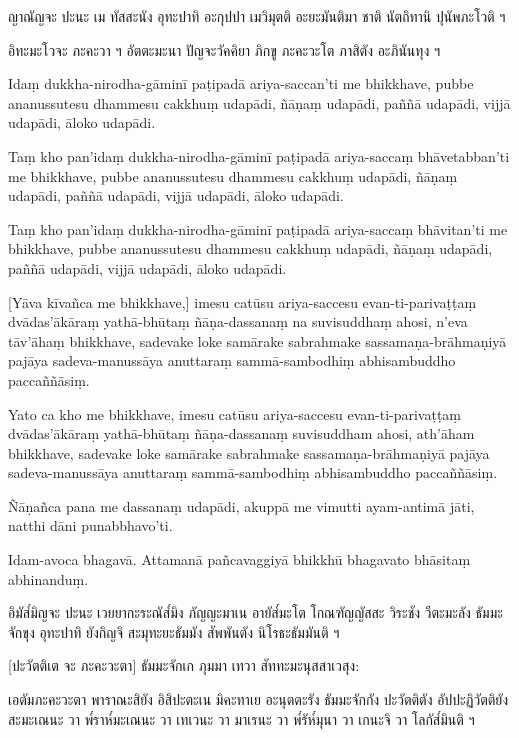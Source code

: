 \documentclass[
  babelLanguage=thai,
  final,
]{chantingbook}
\begin{document}
ญาณัญจะ ปะนะ เม ทัสสะนัง อุทะปาทิ อะกุปปา เมวิมุตติ อะยะมันติมา ชาติ นัตถิทานิ ปุนัพภะโวติ ฯ

อิทะมะโวจะ ภะคะวา ฯ อัตตะมะนา ปัญจะวัคคิยา ภิกขู ภะคะวะโต ภาสิตัง อะภินันทุง ฯ

\clearpage

\paliText
\markboth{\paliTitle}{\rightmark}

Idaṃ dukkha-nirodha-gāminī paṭipadā ariya-saccan'ti me bhikkhave, pubbe
ananussutesu dhammesu cakkhuṃ udapādi, ñāṇaṃ udapādi, paññā udapādi,
vijjā udapādi, āloko udapādi.

Taṃ kho pan'idaṃ dukkha-nirodha-gāminī paṭipadā ariya-saccaṃ bhāvetabban'ti
me bhikkhave, pubbe ananussutesu dhammesu cakkhuṃ udapādi, ñāṇaṃ
udapādi, paññā udapādi, vijjā udapādi, āloko udapādi.

Taṃ kho pan'idaṃ dukkha-nirodha-gāminī paṭipadā ariya-saccaṃ bhāvitan'ti me
bhikkhave, pubbe ananussutesu dhammesu cakkhuṃ udapādi, ñāṇaṃ udapādi,
paññā udapādi, vijjā udapādi, āloko udapādi.

[Yāva kīvañca me bhikkhave,] imesu catūsu ariya-saccesu evan-ti-parivaṭṭaṃ
dvādas'ākāraṃ yathā-bhūtaṃ ñāṇa-dassanaṃ na suvisuddhaṃ ahosi, n'eva tāv'āhaṃ
bhikkhave, sadevake loke samārake sabrahmake sassamaṇa-brāhmaṇiyā pajāya
sadeva-manussāya anuttaraṃ sammā-sambodhiṃ abhisambuddho paccaññāsiṃ.

Yato ca kho me bhikkhave, imesu catūsu ariya-saccesu evan-ti-parivaṭṭaṃ
dvādas'ākāraṃ yathā-bhūtaṃ ñāṇa-dassanaṃ suvisuddham ahosi, ath'āham
bhikkhave, sadevake loke samārake sabrahmake sassamaṇa-brāhmaṇiyā pajāya
sadeva-manussāya anuttaraṃ sammā-sambodhiṃ abhisambuddho paccaññāsiṃ.

Ñāṇañca pana me dassanaṃ udapādi, akuppā me vimutti ayam-antimā jāti,
natthi dāni punabbhavo'ti.

Idam-avoca bhagavā. Attamanā pañcavaggiyā bhikkhū bhagavato bhāsitaṃ
abhinanduṃ.

\clearpage

\thaiText
\markboth{\thaiTitle}{\rightmark}

อิมัส๎มิญจะ ปะนะ เวยยากะระณัส๎มิง ภัญญะมาเน อายัส๎มะโต โกณฑัญญัสสะ วิระชัง
วีตะมะลัง ธัมมะจักขุง อุทะปาทิ ยังกิญจิ สะมุทะยะธัมมัง สัพพันตัง นิโรธะธัมมันติ ฯ

[ปะวัตติเต จะ ภะคะวะตา] ธัมมะจักเก ภุมมา เทวา สัททะมะนุสสาเวสุง:

เอตัมภะคะวะตา พาราณะสิยัง อิสิปะตะเน มิคะทาเย อะนุตตะรัง ธัมมะจักกัง ปะวัตติตัง อัปปะฏิวัตติยัง
สะมะเณนะ วา พ๎ราห๎มะเณนะ วา เทเวนะ วา มาเรนะ วา พ๎รัห๎มุนา วา เกนะจิ วา โลกัส๎มินติ ฯ
\end{document}
